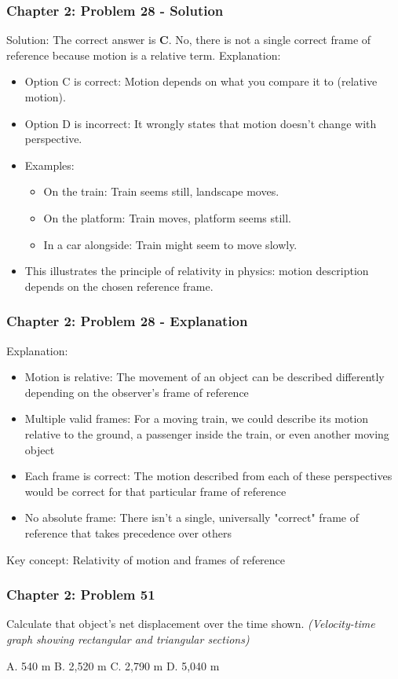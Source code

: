 \documentclass{beamer}
\begin{document}
\begin{frame}
\frametitle{Chapter 2: Problem 28 - Solution}
Solution: The correct answer is \textbf{C}. No, there is not a single correct frame of reference because motion is a relative term.
Explanation:
\begin{itemize}
\item Option C is correct: Motion depends on what you compare it to (relative motion).
\item Option D is incorrect: It wrongly states that motion doesn't change with perspective.
\item Examples:
\begin{itemize}
\item On the train: Train seems still, landscape moves.
\item On the platform: Train moves, platform seems still.
\item In a car alongside: Train might seem to move slowly.
\end{itemize}
\item This illustrates the principle of relativity in physics: motion description depends on the chosen reference frame.
\end{itemize}
\end{frame}
\begin{frame}
\frametitle{Chapter 2: Problem 28 - Explanation}
Explanation:
\begin{itemize}
    \item Motion is relative: The movement of an object can be described differently depending on the observer's frame of reference
    \item Multiple valid frames: For a moving train, we could describe its motion relative to the ground, a passenger inside the train, or even another moving object
    \item Each frame is correct: The motion described from each of these perspectives would be correct for that particular frame of reference
    \item No absolute frame: There isn't a single, universally "correct" frame of reference that takes precedence over others
\end{itemize}
Key concept: Relativity of motion and frames of reference
\end{frame}

\begin{frame}
\frametitle{Chapter 2: Problem 51}
Calculate that object's net displacement over the time shown.
\vspace{1em}
\textit{(Velocity-time graph showing rectangular and triangular sections)}
\vspace{1em}

A. 540 m
B. 2,520 m
C. 2,790 m
D. 5,040 m
\end{frame}
\end{document}
